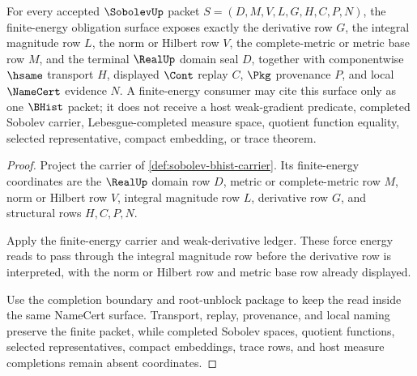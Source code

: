 \begin{theorem}
\label{thm:sobolev-finite-energy-namecert-obligation}
For every accepted $\SobolevUp$ packet $S=(D,M,V,L,G,H,C,P,N)$, the finite-energy obligation surface exposes exactly the derivative row $G$, the integral magnitude row $L$, the norm or Hilbert row $V$, the complete-metric or metric base row $M$, and the terminal $\RealUp$ domain seal $D$, together with componentwise $\hsame$ transport $H$, displayed $\Cont$ replay $C$, $\Pkg$ provenance $P$, and local $\NameCert$ evidence $N$. A finite-energy consumer may cite this surface only as one $\BHist$ packet; it does not receive a host weak-gradient predicate, completed Sobolev carrier, Lebesgue-completed measure space, quotient function equality, selected representative, compact embedding, or trace theorem.
\end{theorem}
\begin{proof}
Project the carrier of \autoref{def:sobolev-bhist-carrier}. Its finite-energy coordinates are the $\RealUp$ domain row $D$, metric or complete-metric row $M$, norm or Hilbert row $V$, integral magnitude row $L$, derivative row $G$, and structural rows $H,C,P,N$.

Apply the finite-energy carrier and weak-derivative ledger. These force energy reads to pass through the integral magnitude row before the derivative row is interpreted, with the norm or Hilbert row and metric base row already displayed.

Use the completion boundary and root-unblock package to keep the read inside the same NameCert surface. Transport, replay, provenance, and local naming preserve the finite packet, while completed Sobolev spaces, quotient functions, selected representatives, compact embeddings, trace rows, and host measure completions remain absent coordinates.
\end{proof}

